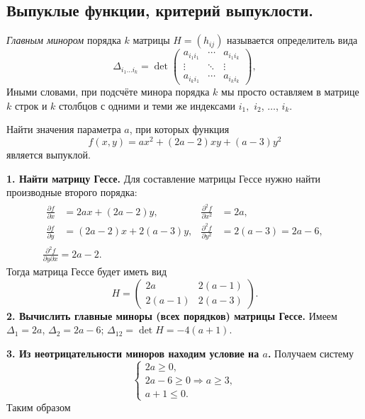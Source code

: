 \subsection{Выпуклые функции, критерий выпуклости.}
\begin{definition}
  \emph{Главным минором} порядка $ k $ матрицы $ H = (h_{ij}) $ называется
  определитель вида 
  \[
    \Delta_{i_1\ldots i_k} = \det \begin{pmatrix}
      a_{i_1i_1} & \cdots & a_{i_1i_k} \\
      \vdots & \ddots & \vdots \\
      a_{i_ki_1} & \cdots & a_{i_ki_k}
    \end{pmatrix},
  \]
 Иными словами, при подсчёте минора порядка $ k $ мы просто оставляем в матрице
 $ k $ строк и $ k $ столбцов с одними и теми же индексами $ i_1, $ $ i_2 $, $ \ldots $, $ i_k $.
\end{definition}

\begin{example}
  Найти значения параметра $ a $, при которых функция 
  \[
      f(x, y) = ax^2 + (2a-2)xy + (a-3)y^2
  \]
  является выпуклой.
  \begin{solution}
    \textbf{1. Найти матрицу Гессе.} Для составление матрицы Гессе нужно найти
    производные второго порядка: 
    \begin{gather*}
    \begin{aligned}
      \frac{\partial f}{\partial x} &= 2ax + (2a-2)y, & \frac{\partial^2
      f}{\partial x^2} &=2a, \\
      \frac{\partial f}{\partial y} &= (2a-2)x + 2(a-3) y, & \frac{\partial^2
      f}{\partial y^2} &= 2(a-3) = 2a - 6,
    \end{aligned} \\ 
    \frac{\partial^2 f}{\partial y \partial x} = 2a -2.
  \end{gather*}
  Тогда матрица Гессе будет иметь вид 
  \[
      H = \begin{pmatrix}
        2a & 2(a-1) \\
        2(a-1) & 2(a-3)
      \end{pmatrix}.
  \]
  \textbf{2. Вычислить главные миноры (всех порядков) матрицы Гессе.} Имеем $
  \Delta_1 = 2a $, $ \Delta_2 = 2a -6 $; $ \Delta_{12} = \det H = -4(a+1) $.

  \textbf{3. Из неотрицательности миноров находим условие на $ a $.} Получаем
  систему  
  \[
      \begin{cases}
        2a \geqslant 0, \\
        2a - 6 \geqslant 0 \Rightarrow a \geqslant 3, \\
        a + 1 \leqslant 0.
      \end{cases}
  \]
  Таким образом  
    
  \end{solution}
\end{example}
